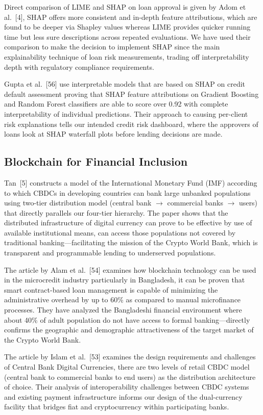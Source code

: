 \documentclass[12pt,a4paper]{report}
\begin{document}
Direct comparison of LIME and SHAP on loan approval is given by Adom et al.~[4], SHAP offers more consistent and in-depth feature attributions, which are found to be deeper via Shapley values whereas LIME provides quicker running time but less sure descriptions across repeated evaluations. We have used their comparison to make the decision to implement SHAP since the main explainability technique of loan risk measurements, trading off interpretability depth with regulatory compliance requirements.

Gupta et al.~[56] use interpretable models that are based on SHAP on credit default assessment proving that SHAP feature attributions on Gradient Boosting and Random Forest classifiers are able to score over 0.92 with complete interpretability of individual predictions. Their approach to causing per-client risk explanations tells our intended credit risk dashboard, where the approvers of loans look at SHAP waterfall plots before lending decisions are made.

\subsection{Blockchain for Financial Inclusion}

Tan~[5] constructs a model of the International Monetary Fund (IMF) according to which CBDCs in developing countries can bank large unbanked populations using two-tier distribution model (central bank $\to$ commercial banks $\to$ users) that directly parallels our four-tier hierarchy. The paper shows that the distributed infrastructure of digital currency can prove to be effective by use of available institutional means, can access those populations not covered by traditional banking---facilitating the mission of the Crypto World Bank, which is transparent and programmable lending to underserved populations.

The article by Alam et al.~[54] examines how blockchain technology can be used in the microcredit industry particularly in Bangladesh, it can be proven that smart contract-based loan management is capable of minimizing the administrative overhead by up to 60\% as compared to manual microfinance processes. They have analyzed the Bangladeshi financial environment where about 40\% of adult population do not have access to formal banking---directly confirms the geographic and demographic attractiveness of the target market of the Crypto World Bank.

The article by Islam et al.~[53] examines the design requirements and challenges of Central Bank Digital Currencies, there are two levels of retail CBDC model (central bank to commercial banks to end users) as the distribution architecture of choice. Their analysis of interoperability challenges between CBDC systems and existing payment infrastructure informs our design of the dual-currency facility that bridges fiat and cryptocurrency within participating banks.
\end{document}
